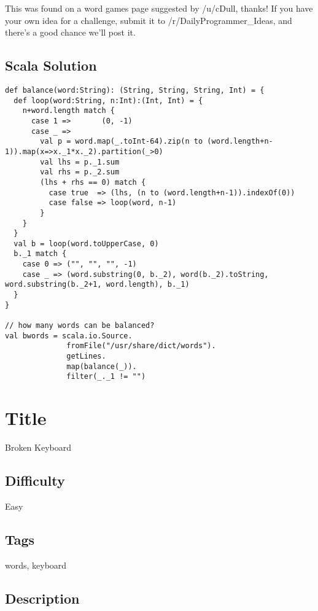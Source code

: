 This was found on a word games page suggested by /u/cDull, thanks! If
you have your own idea for a challenge, submit it to
/r/DailyProgrammer\_Ideas, and there's a good chance we'll post it.

\subsection{Scala Solution}\label{scala-solution-1}

\begin{verbatim}
def balance(word:String): (String, String, String, Int) = {
  def loop(word:String, n:Int):(Int, Int) = {
    n+word.length match {
      case 1 =>       (0, -1)
      case _ =>
        val p = word.map(_.toInt-64).zip(n to (word.length+n-1)).map(x=>x._1*x._2).partition(_>0)
        val lhs = p._1.sum
        val rhs = p._2.sum
        (lhs + rhs == 0) match {
          case true  => (lhs, (n to (word.length+n-1)).indexOf(0))
          case false => loop(word, n-1)
        }
    }
  }
  val b = loop(word.toUpperCase, 0)
  b._1 match {
    case 0 => ("", "", "", -1)
    case _ => (word.substring(0, b._2), word(b._2).toString, word.substring(b._2+1, word.length), b._1)
  }
}

// how many words can be balanced?
val bwords = scala.io.Source.
              fromFile("/usr/share/dict/words").
              getLines.
              map(balance(_)).
              filter(_._1 != "")
\end{verbatim}

\section{Title}\label{title-2}

Broken Keyboard

\subsection{Difficulty}\label{difficulty-2}

Easy

\subsection{Tags}\label{tags-2}

words, keyboard

\subsection{Description}\label{description-2}

